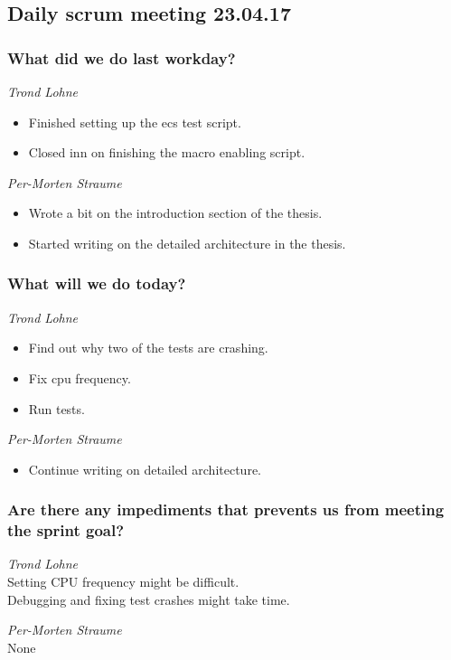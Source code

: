 \documentclass{article}
\begin{document}
\begin{center}
\subsection*{Daily scrum meeting 23.04.17}
\end{center}
\bigskip


\subsubsection*{What did we do last workday?}

\noindent\textit{Trond Lohne}
\begin{itemize}
	\item
    Finished setting up the ecs test script.

    \item
	Closed inn on finishing the macro enabling script.
\end{itemize}

\medskip

\noindent\textit{Per-Morten Straume}
\begin{itemize}
	\item
	Wrote a bit on the introduction section of the thesis.

	\item
	Started writing on the detailed architecture in the thesis.
\end{itemize}


\subsubsection*{What will we do today?}

\noindent\textit{Trond Lohne}
\begin{itemize}
	\item
	Find out why two of the tests are crashing.

	\item
	Fix cpu frequency.

	\item
	Run tests.
\end{itemize}

\medskip

\noindent\textit{Per-Morten Straume}
\begin{itemize}
	\item
	Continue writing on detailed architecture.
\end{itemize}


\subsubsection*{Are there any impediments that prevents us from meeting the sprint goal?}

\noindent\textit{Trond Lohne}\\
Setting CPU frequency might be difficult.\\
Debugging and fixing test crashes might take time.

\medskip

\noindent\textit{Per-Morten Straume}\\
None
\end{document}
